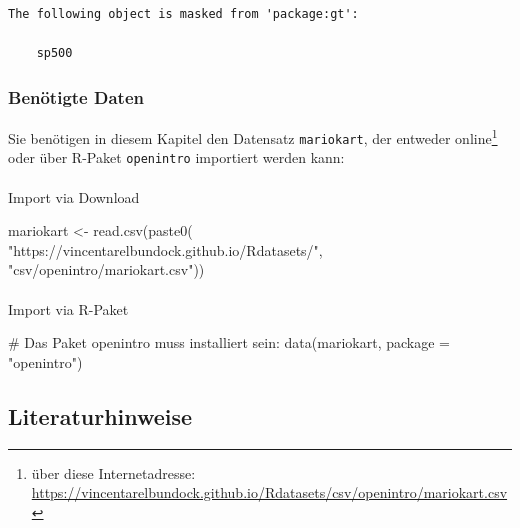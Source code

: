 \documentclass[
  letterpaper,
  DIV=11,
  numbers=noendperiod]{scrartcl}
\makeatletter
\let\oldparagraph\paragraph
\renewcommand{\paragraph}{
    \@ifstar
      \xxxParagraphStar
      \xxxParagraphNoStar
  }
\newcommand{\xxxParagraphStar}[1]{\oldparagraph*{#1}\mbox{}}
\newcommand{\xxxParagraphNoStar}[1]{\oldparagraph{#1}\mbox{}}
\newenvironment{Shaded}{\begin{snugshade}}{\end{snugshade}}
\newcommand{\AttributeTok}[1]{\textcolor[rgb]{0.40,0.45,0.13}{#1}}
\newcommand{\CommentTok}[1]{\textcolor[rgb]{0.37,0.37,0.37}{#1}}
\newcommand{\FunctionTok}[1]{\textcolor[rgb]{0.28,0.35,0.67}{#1}}
\newcommand{\NormalTok}[1]{\textcolor[rgb]{0.00,0.23,0.31}{#1}}
\newcommand{\OtherTok}[1]{\textcolor[rgb]{0.00,0.23,0.31}{#1}}
\newcommand{\StringTok}[1]{\textcolor[rgb]{0.13,0.47,0.30}{#1}}
\theoremstyle{definition}
\theoremstyle{definition}
\theoremstyle{definition}
\theoremstyle{remark}
\makeatother
\begin{document}
\begin{verbatim}
The following object is masked from 'package:gt':

    sp500
\end{verbatim}

\subsubsection{Benötigte Daten}\label{benuxf6tigte-daten}

Sie benötigen in diesem Kapitel den Datensatz \texttt{mariokart}, der
entweder online\footnote{ über diese Internetadresse:
  \url{https://vincentarelbundock.github.io/Rdatasets/csv/openintro/mariokart.csv}}
oder über R-Paket \texttt{openintro} importiert werden kann:

\paragraph{Import via Download}\label{import-via-download}

\begin{Shaded}
\begin{Highlighting}[]
\NormalTok{mariokart }\OtherTok{\textless{}{-}} \FunctionTok{read.csv}\NormalTok{(}\FunctionTok{paste0}\NormalTok{(}
  \StringTok{"https://vincentarelbundock.github.io/Rdatasets/"}\NormalTok{,}
  \StringTok{"csv/openintro/mariokart.csv"}\NormalTok{))}
\end{Highlighting}
\end{Shaded}

\paragraph{Import via R-Paket}\label{import-via-r-paket}

\begin{Shaded}
\begin{Highlighting}[]
\CommentTok{\# Das Paket \textquotesingle{}openintro\textquotesingle{} muss installiert sein:}
\FunctionTok{data}\NormalTok{(mariokart, }\AttributeTok{package =} \StringTok{"openintro"}\NormalTok{) }
\end{Highlighting}
\end{Shaded}

\subsection{Literaturhinweise}\label{literaturhinweise}
\end{document}
